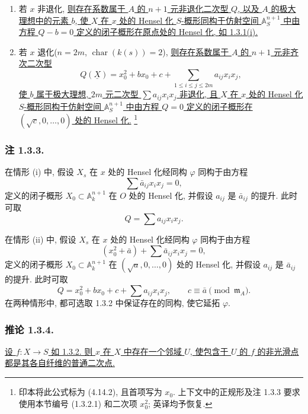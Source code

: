 \begin{enumerate}[label=(\roman*),leftmargin=2.6em]
\item 若 $x$ 非退化, \underline{则存在系数属于 $A$ 的 $n+1$ 元非退化二次型 $Q$, 以及 $A$ 的极大理想中的元素 $b$, 使 $X$ 在 $x$ 处的 Hensel 化 $S$-概形同构于仿射空间 $\mathbb A_S^{n+1}$ 中由方程 $Q-b=0$ 定义的闭子概形在原点处的 Hensel 化, 如 1.3.1(i).}

\item 若 $x$ 退化($n=2m$, $\operatorname{char}(k(s))=2$), \underline{则存在系数属于 $A$ 的 $n+1$ 元非齐次二次型}
\begin{equation}\tag{1.3.2.1}
Q(\underline X)=x_0^2+b x_0+c+
 \sum_{1\leq i\leq j\leq 2m}a_{ij}x_i x_j,
\end{equation}
\underline{使 $b$ 属于极大理想, $2m$ 元二次型 $\sum a_{ij}x_i x_j$ 非退化, 且 $X$ 在 $x$ 处的 Hensel 化 $S$-概形同构于仿射空间 $\mathbb A_S^{n+1}$ 中由方程 $Q=0$ 定义的闭子概形在 $(\sqrt c,0,\ldots,0)$ 处的 Hensel 化.}
\footnote{印本将此公式标为 (4.14.2), 且首项写为 $x_0$. 上下文中的正规形及注 1.3.3 要求使用本节编号 (1.3.2.1) 和二次项 $x_0^2$; 英译均予恢复.}
\end{enumerate}

\subsubsection*{注 1.3.3.}
在情形 (i) 中, 假设 $X_s$ 在 $x$ 处的 Hensel 化经同构 $\varphi$ 同构于由方程
\[
\sum\bar a_{ij}x_i x_j=0,
\]
定义的闭子概形 $X_0\subset\mathbb A_k^{n+1}$ 在 $O$ 处的 Hensel 化, 并假设 $a_{ij}$ 是 $\bar a_{ij}$ 的提升. 此时可取
\[
Q=\sum a_{ij}x_i x_j.
\]

在情形 (ii) 中, 假设 $X_s$ 在 $x$ 处的 Hensel 化经同构 $\varphi$ 同构于由方程
\[
(x_0^2+\bar a)+\sum\bar a_{ij}x_i x_j=0,
\]
定义的闭子概形 $X_0\subset\mathbb A_k^{n+1}$ 在 $(\sqrt a,0,\ldots,0)$ 处的 Hensel 化, 并假设 $a_{ij}$ 是 $\bar a_{ij}$ 的提升. 此时可取
\[
Q=x_0^2+b x_0+c+\sum a_{ij}x_i x_j,
\qquad c\equiv\bar a\pmod{\mathfrak m_A}.
\]
在两种情形中, 都可选取 1.3.2 中保证存在的同构, 使它延拓 $\varphi$.

\subsubsection*{推论 1.3.4.}
\underline{设 $f:X\to S$ 如 1.3.2. 则 $x$ 在 $X$ 中存在一个邻域 $U$, 使包含于 $U$ 的 $f$ 的非光滑点都是其各自纤维的普通二次点.}